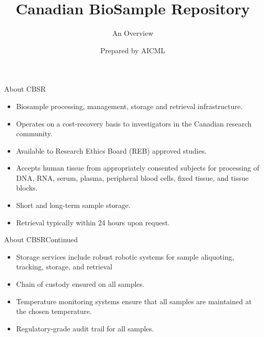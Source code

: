 \documentclass[hyperref={pdfpagelabels=false}]{beamer}
\title[CBSR Overview]{Canadian BioSample Repository}
\subtitle{An Overview}
\author{Prepared by AICML}
\begin{document}
\begin{frame}
  \titlepage
\end{frame}



\begin{frame}{About CBSR}
  \begin{itemize}
    \item Biosample processing, management, storage and retrieval
      infrastructure.
    \item Operates on a cost-recovery basis to investigators in the Canadian
      research community.
    \item Available to Research Ethics Board (REB) approved studies.
    \item Accepts human tissue from appropriately consented subjects for
      processing of DNA, RNA, serum, plasma, peripheral blood cells, fixed
      tissue, and tissue blocks.
    \item Short and long-term sample storage.
    \item Retrieval typically within 24 hours upon request.
  \end{itemize}
\end{frame}

\begin{frame}{About CBSR}{Continued}
  \begin{itemize}
    \item Storage services include robust robotic systems for sample
      aliquoting, tracking, storage, and retrieval
    \item Chain of custody ensured on all samples.
    \item Temperature monitoring systems ensure that all samples are maintained
      at the chosen temperature.
    \item Regulatory-grade audit trail for all samples.
  \end{itemize}
\end{frame}
\end{document}
